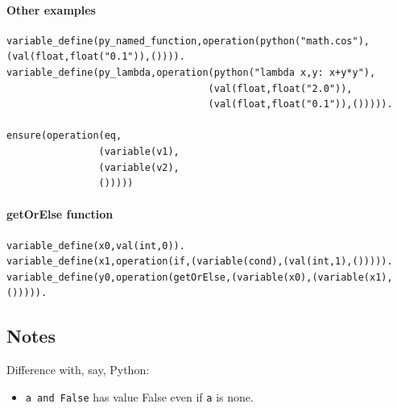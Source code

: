 \paragraph{Other examples}

\begin{verbatim}
variable_define(py_named_function,operation(python("math.cos"),(val(float,float("0.1")),()))).
variable_define(py_lambda,operation(python("lambda x,y: x+y*y"),
                                   (val(float,float("2.0")),
                                   (val(float,float("0.1")),())))).

ensure(operation(eq,
                (variable(v1),
                (variable(v2),
                ()))))
\end{verbatim}

\paragraph{getOrElse function}

\begin{verbatim}
variable_define(x0,val(int,0)).
variable_define(x1,operation(if,(variable(cond),(val(int,1),())))).
variable_define(y0,operation(getOrElse,(variable(x0),(variable(x1),())))).
\end{verbatim}


\subsection{Notes}

Difference with, say, Python:
\begin{itemize}
\item \texttt{a and False} has value False even if \texttt{a} is none.
\end{itemize}
